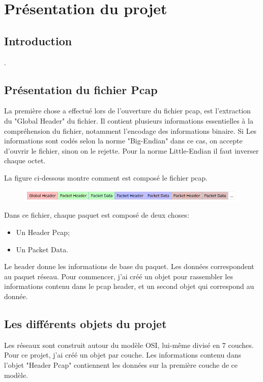 \chapter{Présentation du projet}


\section{Introduction}

.


\section{Présentation du fichier Pcap}

La première chose a effectué lors de l'ouverture du fichier pcap, est l'extraction du "Global Header" du fichier.
Il contient plusieurs informations essentielles à la compréhension du fichier, notamment l'encodage des informations binaire.
Si Les informations sont codés selon la norme "Big-Endian" dans ce cas, on accepte d'ouvrir le fichier, sinon on le rejette.
Pour la norme Little-Endian il faut inverser chaque octet.

La figure ci-dessous montre comment est composé le fichier pcap.
\begin{figure}[!h]
    \begin{center}
\includegraphics[width=15cm]{./globalHeader.png}
    \end{center}
\end{figure}

Dans ce fichier, chaque paquet est composé de deux choses:
\begin{itemize}
    \item Un Header Pcap;
    \item Un Packet Data.
\end{itemize}       
Le header donne les informations de base du paquet.
Les données correspondent au paquet réseau. 
Pour commencer, j'ai créé un objet pour rassembler les informations contenu dans le pcap header, et un second objet qui correspond au donnée.


\section{Les différents objets du projet}

Les réseaux sont construit autour du modèle OSI, lui-même divisé en 7 couches.
Pour ce projet, j'ai créé un objet par couche. Les informations contenu dans l'objet "Header Pcap" contiennent les données sur la première couche de ce modèle.

